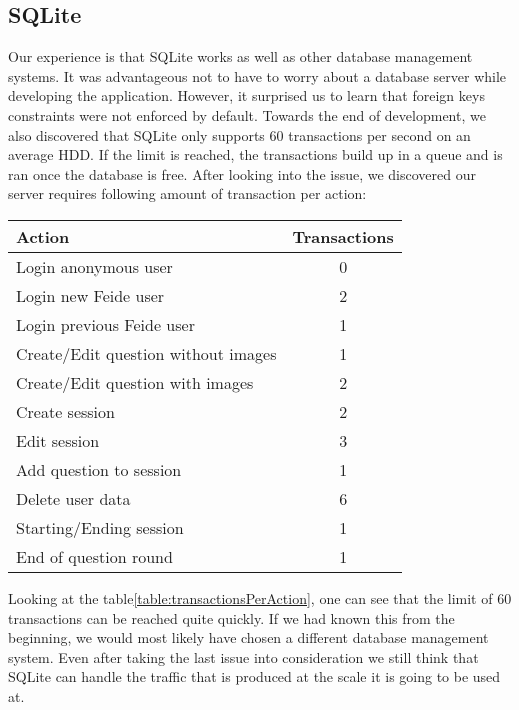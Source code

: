 \subsection{SQLite}
Our experience is that SQLite works as well as other database management systems. It was advantageous not to have to worry about a database server while developing the application. However, it surprised us to learn that foreign keys constraints were not enforced by default. Towards the end of development, we also discovered that SQLite only supports 60 transactions per second on an average HDD. If the limit is reached, the transactions build up in a queue and is ran once the database is free. After looking into the issue, we discovered our server requires following amount of transaction per action:
\begin{center}
    \begin{tabular}{|l|c|}
        \hline
        Action & Transactions \\
        \hline
        Login anonymous user & 0 \\
        \hline
        Login new Feide user & 2 \\
        \hline
        Login previous Feide user & 1 \\
        \hline
        Create/Edit question without images & 1 \\
        \hline
        Create/Edit question with images & 2 \\
        \hline
        Create session & 2 \\
        \hline
        Edit session & 3 \\
        \hline
        Add question to session & 1 \\
        \hline
        Delete user data & 6 \\
        \hline
        Starting/Ending session & 1 \\
        \hline
        End of question round & 1 \\
        \hline
    \end{tabular}
    \label{table:transactionsPerAction}
\end{center}
\noindent
Looking at the table\ref{table:transactionsPerAction}, one can see that the limit of 60 transactions can be reached quite quickly. If we had known this from the beginning, we would most likely have chosen a different database management system. Even after taking the last issue into consideration we still think that SQLite can handle the traffic that is produced at the scale it is going to be used at. 
